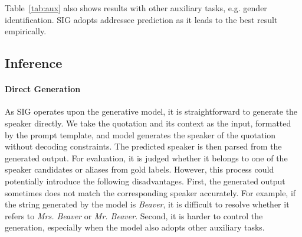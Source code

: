 \documentclass[letterpaper]{article} %
\begin{document}
Table~\ref{tab:aux} also shows results with other auxiliary tasks, e.g. gender identification. SIG adopts addressee prediction as it leads to the best result empirically.

\subsection{Inference}
\label{ssec:inference}

\paragraph{Direct Generation}
As SIG operates upon the generative model, it is straightforward to generate the speaker directly.
We take the quotation and its context as the input, formatted by the prompt template, and model generates the speaker of the quotation without decoding constraints.
The predicted speaker is then parsed from the generated output.
For evaluation, it is judged whether it belongs to one of the speaker candidates or aliases from gold labels. 
However, this process could potentially introduce the following disadvantages. First, the generated output sometimes does not match the corresponding speaker accurately. For example, if the string generated by the model is \textit{Beaver}, it is difficult to resolve whether it refers to \textit{Mrs. Beaver} or \textit{Mr. Beaver}. Second, it is harder to control the generation, especially when the model also adopts other auxiliary tasks. %
\end{document}
